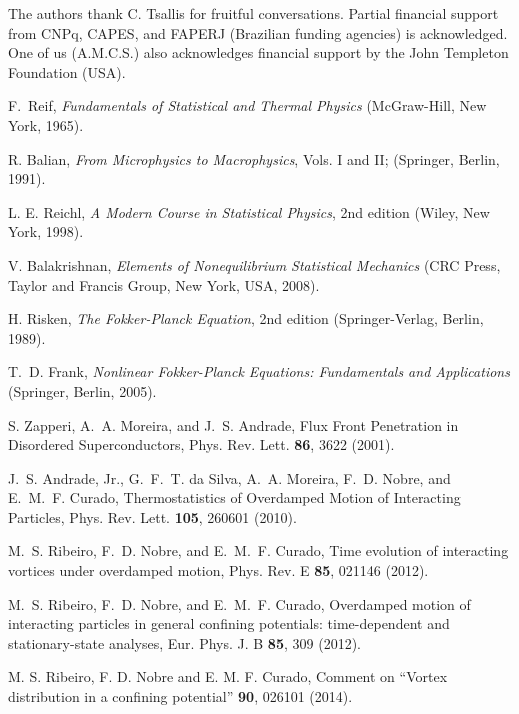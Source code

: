 \documentclass[showpacs,preprintnumbers,amsmath,amssymb,eqsecnum]{revtex4}
\begin{document}
\begin{acknowledgments}
The authors thank C. Tsallis for fruitful
conversations. Partial financial support from CNPq,
CAPES, and FAPERJ (Brazilian funding agencies) is acknowledged.
One of us (A.M.C.S.) also acknowledges financial support by the John Templeton Foundation (USA).
\end{acknowledgments}

\baselineskip

\begin{thebibliography}{99}

F.~Reif, {\it Fundamentals of Statistical and Thermal Physics}
(McGraw-Hill, New York, 1965).

R. Balian, {\it From Microphysics to Macrophysics}, Vols. I and II;
(Springer, Berlin, 1991).

L. E. Reichl, {\it A Modern Course in Statistical Physics}, 2nd edition
(Wiley, New York, 1998).

V. Balakrishnan, {\it Elements of Nonequilibrium Statistical Mechanics}
(CRC Press, Taylor and Francis Group, New York, USA, 2008).

H. Risken, {\it The Fokker-Planck Equation}, 2nd edition
(Springer-Verlag, Berlin, 1989).

T.~D. Frank, {\it Nonlinear Fokker-Planck Equations: Fundamentals and
Applications} (Springer, Berlin, 2005).

S. Zapperi, A.~A. Moreira, and J.~S. Andrade, Flux Front Penetration in
Disordered Superconductors, Phys. Rev. Lett. {\bf 86}, 3622 (2001).

J.~S. Andrade, Jr., G.~F.~T. da Silva, A.~A. Moreira, F.~D. Nobre,
and E.~M.~F. Curado, Thermostatistics of Overdamped Motion of Interacting
Particles, Phys. Rev. Lett. {\bf 105}, 260601 (2010).

M.~S. Ribeiro, F.~D. Nobre, and E.~M.~F. Curado, Time evolution of interacting
vortices under overdamped motion, Phys. Rev. E \textbf{85}, 021146 (2012).

M.~S. Ribeiro, F.~D. Nobre, and E.~M.~F. Curado, Overdamped motion of
interacting particles in general confining potentials: time-dependent and
stationary-state analyses, Eur. Phys. J. B \textbf{85}, 309 (2012).

M. S. Ribeiro, F. D. Nobre and E. M. F. Curado, Comment on ``Vortex
distribution in a confining potential'' {\bf 90}, 026101 (2014).


\end{thebibliography}
\end{document}
